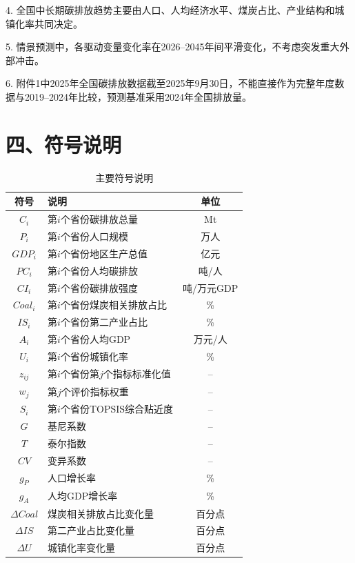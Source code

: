 \documentclass[UTF8,zihao=-4,fontset=fandol]{ctexart}
\begin{document}
4. 全国中长期碳排放趋势主要由人口、人均经济水平、煤炭占比、产业结构和城镇化率共同决定。

5. 情景预测中，各驱动变量变化率在2026--2045年间平滑变化，不考虑突发重大外部冲击。

6. 附件1中2025年全国碳排放数据截至2025年9月30日，不能直接作为完整年度数据与2019--2024年比较，预测基准采用2024年全国排放量。

\section*{四、符号说明}

\begin{table}[H]
\centering
\caption{主要符号说明}
\begin{tabularx}{0.92\textwidth}{cXc}
\toprule
符号 & 说明 & 单位 \\
\midrule
$C_i$ & 第$i$个省份碳排放总量 & Mt \\
$P_i$ & 第$i$个省份人口规模 & 万人 \\
$GDP_i$ & 第$i$个省份地区生产总值 & 亿元 \\
$PC_i$ & 第$i$个省份人均碳排放 & 吨/人 \\
$CI_i$ & 第$i$个省份碳排放强度 & 吨/万元GDP \\
$Coal_i$ & 第$i$个省份煤炭相关排放占比 & \% \\
$IS_i$ & 第$i$个省份第二产业占比 & \% \\
$A_i$ & 第$i$个省份人均GDP & 万元/人 \\
$U_i$ & 第$i$个省份城镇化率 & \% \\
$z_{ij}$ & 第$i$个省份第$j$个指标标准化值 & -- \\
$w_j$ & 第$j$个评价指标权重 & -- \\
$S_i$ & 第$i$个省份TOPSIS综合贴近度 & -- \\
$G$ & 基尼系数 & -- \\
$T$ & 泰尔指数 & -- \\
$CV$ & 变异系数 & -- \\
$g_P$ & 人口增长率 & \% \\
$g_A$ & 人均GDP增长率 & \% \\
$\Delta Coal$ & 煤炭相关排放占比变化量 & 百分点 \\
$\Delta IS$ & 第二产业占比变化量 & 百分点 \\
$\Delta U$ & 城镇化率变化量 & 百分点 \\
\bottomrule
\end{tabularx}
\end{table}
\end{document}
